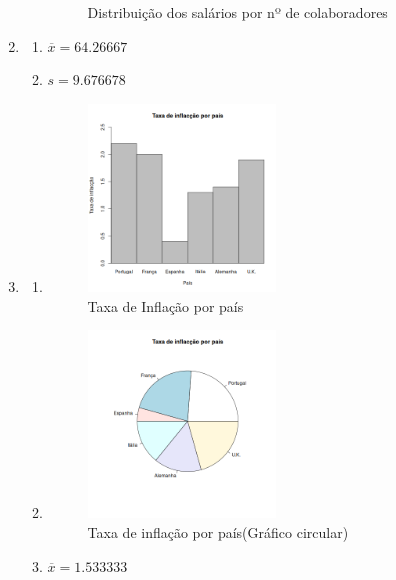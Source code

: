 \documentclass[11pt,a4paper]{report}
\begin{document}
\begin{enumerate}[label=\arabic{chapter}.\arabic*]
\begin{enumerate}[label=\alph*)]
\begin{figure}[h!]
				\caption{Distribuição dos salários por nº de colaboradores}
			\end{figure}
		\end{enumerate}
	\clearpage
	\item{}\hfill
		
		\begin{enumerate}[label=\alph*)]
		\item$\overline{x} = 64.26667$
		\item$s = 9.676678$
		\end{enumerate}
	\clearpage
	\item{}\hfill
		
		\begin{enumerate}[label=\alph*)]
		\item\hfill
			\begin{figure}[h!]
				\centering
				\includegraphics[width=0.5\textwidth]{imagem/ex4_4a.png}
				\caption{Taxa de Inflação por país}
			\end{figure}
	\clearpage
		\item\hfill
			\begin{figure}[h!]
				\centering
				\includegraphics[width=0.5\textwidth]{imagem/ex4_4b.png}
				\caption{Taxa de inflação por país(Gráfico
				circular)}
			\end{figure}
		\item$\overline{x} = 1.533333$
		\end{enumerate}
\end{enumerate}


\printbibliography[heading=bibintoc,title={Bibliografia}]
\begingroup
\let\clearpage\relax
\listoftables{}
\listoffigures{}
\endgroup
\end{document}
